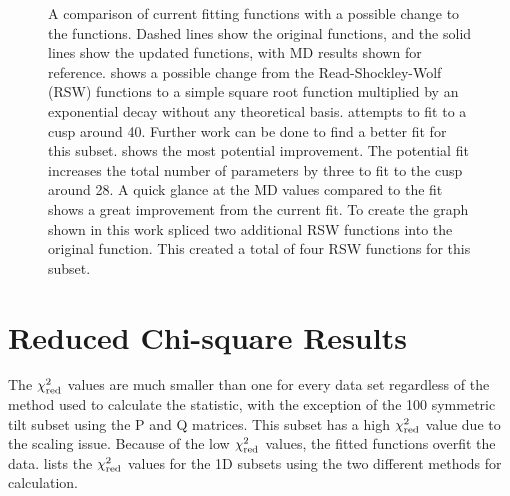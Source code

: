 \documentclass[twoside,senior]{BYUPhys}
\begin{document}
\begin{figure}[ht!]
 
 \caption[Possible changes to fitting functions for the 1D twist subsets.]{\label{fig:updatedGraphs} A comparison of current fitting functions with a possible change to the functions.  Dashed lines show the original functions, and the solid lines show the updated functions, with MD results shown for reference. \protect{} shows a possible change from the Read-Shockley-Wolf (RSW) functions to a simple square root function multiplied by an exponential decay without any theoretical basis.  \protect{} attempts to fit to a cusp around 40\textdegree{}.  Further work can be done to find a better fit for this subset. \protect{} shows the most potential improvement.  The potential fit increases the total number of parameters by three to fit to the cusp around 28\textdegree.  A quick glance at the MD values compared to the fit shows a great improvement from the current fit.  To create the graph shown in \protect{} this work spliced two additional RSW functions into the original function.  This created a total of four RSW functions for this subset.}
 
\end{figure}

\section{Reduced Chi-square Results\label{results:chi2red}}
The $\chi_{\textnormal{red}}^2$ values are much smaller than one for every data set regardless of the method used to calculate the statistic, with the exception of the \textlangle{}100\textrangle{} symmetric tilt subset using the P and Q matrices.  This subset has a high $\chi_{\textnormal{red}}^2$ value due to the scaling issue.  Because of the low $\chi_{\textnormal{red}}^2$ values, the fitted functions overfit the data.\cite{bevington2003}   lists the $\chi_{\textnormal{red}}^2$ values for the 1D subsets using the two different methods for calculation. 
\end{document}
